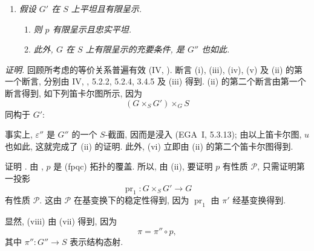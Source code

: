 \begin{enumerate}
\item[\textup{(xiii)}]\label{concl:sga3-VIB-9.2-xiii}
  \emph{假设 \(G'\) 在 \(S\) 上平坦且有限呈示.}
  \begin{enumerate}
  \item[\textup{a)}]\label{concl:sga3-VIB-9.2-xiii-a}
    \emph{则 \(p\) 有限呈示且忠实平坦.}
  \item[\textup{b)}]\label{concl:sga3-VIB-9.2-xiii-b}
    \emph{此外, \(G\) 在 \(S\) 上有限呈示的充要条件,
    是 \(G''\) 也如此.}
  \end{enumerate}
\end{enumerate}

\emph{证明.}
回顾所考虑的等价关系普遍有效 (IV, ).
断言 \textup{(i)}, \textup{(iii)}, \textup{(iv)}, \textup{(v)}
及 \textup{(ii)} 的第一个断言,
分别由 IV, ,
5.2.2, 5.2.4, 3.4.5 及 \textup{(iii)} 得到.
\textup{(ii)} 的第二个断言由第一个断言得到,
如下列笛卡尔图所示, 因为
\[
  (G\times_SG')\times_GS
\]
同构于 \(G'\):
\begin{center}
  \label{diag:sga3-VIB-9.2-proof-cartesian}%
  {\small
  }
\end{center}
事实上, \(\varepsilon''\) 是 \(G''\) 的一个 \(S\)-截面,
因而是浸入 (EGA~I, 5.3.13);
由以上笛卡尔图, \(u\) 也如此, 这就完成了 \textup{(ii)} 的证明.
此外, \textup{(vi)} 立即由 \textup{(ii)} 的第二个笛卡尔图得到.

证明 \textup{}.
由 \textup{},
\(p\) 是 \textup{(fpqc)} 拓扑的覆盖.
所以, 由 \textup{(ii)}, 要证明 \(p\) 有性质 \(\mathscr P\),
只需证明第一投影
\[
  \operatorname{pr}_1:G\times_SG'\longrightarrow G
\]
有性质 \(\mathscr P\).
这由 \(\mathscr P\) 在基变换下的稳定性得到,
因为 \(\operatorname{pr}_1\) 由 \(\pi'\) 经基变换得到.

显然, \textup{(viii)} 由 \textup{(vii)} 得到, 因为
\[
  \pi=\pi''\circ p,
\]
其中 \(\pi'':G''\to S\) 表示结构态射.

